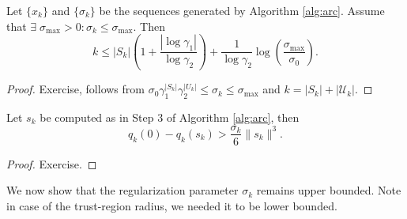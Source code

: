 \documentclass[10pt,a4paper]{article}
\begin{document}
\begin{lemma}\label{lemma:arc_success}
Let $\{x_k\}$ and $\{\sigma_k\}$ be the sequences generated by Algorithm \ref{alg:arc}. Assume that $\exists \; \sigma_{\max} > 0: \sigma_k\leq \sigma_{\max}$. Then
\begin{equation*}
	k \leq |S_k| \left(1 + \frac{|\log \gamma_1|}{\log \gamma_2}\right) + \frac{1}{\log \gamma_2} \log \left(\frac{\sigma_{\max}}{\sigma_0}\right).
\end{equation*}
\end{lemma}
\begin{proof}
	Exercise, follows from $\sigma_0 \gamma_1^{|S_k|} \gamma_2^{|U_k|} \leq \sigma_k\leq \sigma_{\max}$ and $k = |S_k| + |\mathcal{U}_k|$.
\end{proof}

\begin{lemma}\label{lemma:arc_decrease}
	Let $s_k$ be computed as in Step 3 of Algorithm \ref{alg:arc}, then
	\begin{equation*}
		q_k(0)- q_k(s_k) > \frac{\sigma_k}{6} \|s_k\|^3.
	\end{equation*}
\end{lemma}
\begin{proof}
	Exercise.
\end{proof}

\noindent We now show that the regularization parameter $\sigma_k$ remains upper bounded. Note in case of the trust-region radius, we needed it to be lower bounded.
\end{document}
